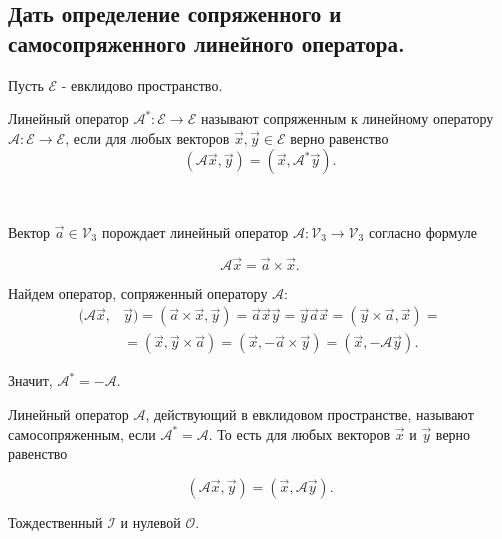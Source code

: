 \subsection{
    Дать определение сопряженного и самосопряженного линейного оператора.
}

Пусть $\mathcal{E}$ - евклидово пространство.

\begin{definition}
    Линейный оператор $\mathscr{A^*} \colon \mathcal{E} \to \mathcal{E}$ называют сопряженным к линейному оператору $\mathscr{A} \colon \mathcal{E} \to \mathcal{E}$, если для любых векторов $\vec{x}, \vec{y} \in \mathcal{E}$ верно равенство
    $$(\mathscr{A}\vec{x}, \vec{y}) = (\vec{x}, \mathscr{A^*}\vec{y}).$$
\end{definition}

\begin{example}~
    
    Вектор $\vec{a} \in \mathcal{V}_3$ порождает линейный оператор $\mathscr{A} \colon \mathcal{V}_3 \to \mathcal{V}_3$ согласно формуле
    
    $$\mathscr{A}\vec{x} = \vec{a} \times \vec{x}.$$

    Найдем оператор, сопряженный оператору $\mathscr{A}$:
    \begin{align*}
        (\mathscr{A}\vec{x}, &\vec{y}) = (\vec{a} \times \vec{x}, \vec{y}) = \vec{a}\vec{x}\vec{y} = \vec{y}\vec{a}\vec{x} = (\vec{y} \times \vec{a}, \vec{x}) = \\
        &= (\vec{x}, \vec{y} \times \vec{a}) = (\vec{x}, -\vec{a} \times \vec{y}) = (\vec{x}, -\mathscr{A}\vec{y}).
    \end{align*}

    Значит, $\mathscr{A^*} = -\mathscr{A}.$
\end{example}

\begin{definition}
    Линейный оператор $\mathscr{A}$, действующий в евклидовом пространстве, называют самосопряженным, если $\mathscr{A^*} = \mathscr{A}$. То есть для любых векторов $\vec{x}$ и $\vec{y}$ верно равенство

    $$(\mathscr{A}\vec{x}, \vec{y}) = (\vec{x}, \mathscr{A}\vec{y}).$$
\end{definition}

\begin{example}
    Тождественный $\mathscr{I}$ и нулевой $\mathscr{O}$.
\end{example}
